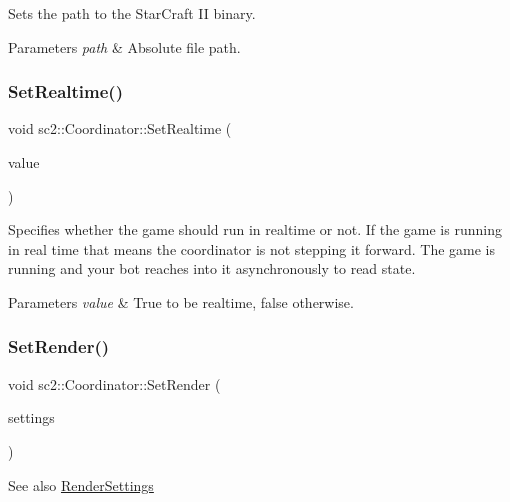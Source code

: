 Sets the path to the Star\+Craft II binary. 
\begin{DoxyParams}{Parameters}
{\em path} & Absolute file path. \\
\hline
\end{DoxyParams}
\mbox{\label{classsc2_1_1_coordinator_a602e6ead93e360771ce36d6ac782fc2a}} 
\subsubsection{\texorpdfstring{Set\+Realtime()}{SetRealtime()}}
{\footnotesize\ttfamily void sc2\+::\+Coordinator\+::\+Set\+Realtime (\begin{DoxyParamCaption}\item[{bool}]{value }\end{DoxyParamCaption})}

Specifies whether the game should run in realtime or not. If the game is running in real time that means the coordinator is not stepping it forward. The game is running and your bot reaches into it asynchronously to read state. 
\begin{DoxyParams}{Parameters}
{\em value} & True to be realtime, false otherwise. \\
\hline
\end{DoxyParams}
\mbox{\label{classsc2_1_1_coordinator_ace8a0630c6b61d28e81c94bbebad3d7d}} 
\subsubsection{\texorpdfstring{Set\+Render()}{SetRender()}}
{\footnotesize\ttfamily void sc2\+::\+Coordinator\+::\+Set\+Render (\begin{DoxyParamCaption}\item[{const \hyperlink{structsc2_1_1_render_settings}{Render\+Settings} \&}]{settings }\end{DoxyParamCaption})}

\begin{DoxySeeAlso}{See also}
\hyperlink{structsc2_1_1_render_settings}{Render\+Settings} 
\end{DoxySeeAlso}
\mbox{\label{classsc2_1_1_coordinator_a7cea718f571effbe25b771315628c685}} 
